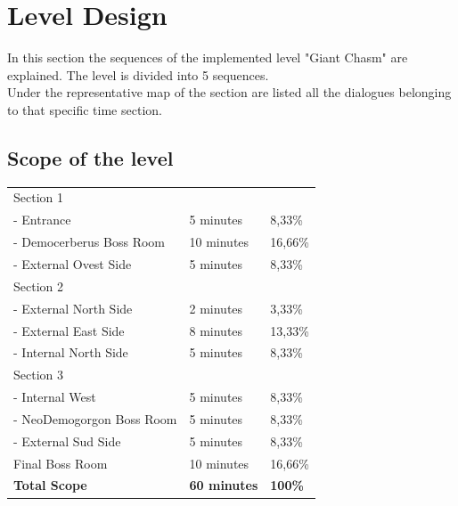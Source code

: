 \section{Level Design}
In this section the sequences of the implemented level "Giant Chasm" are explained. The level is divided into 5 sequences.\\
Under the representative map of the section are listed all the dialogues belonging to that specific time section.

\subsection{Scope of the level}

\vspace*{0.5cm}

\begin{center}
	\begin{tabular}[c]{| p{6cm} | p{4cm} | p{3cm} |}
		\hline
		Section 1 &                & \\
		 - Entrance                   & 5 minutes                  & 8,33\%                 \\
		 - Democerberus Boss Room          & 10 minutes                  & 16,66\%                 \\
		 - External Ovest Side           & 5 minutes			                & 8,33\%	                  \\ \hline
		 Section 2 &                & \\
		 - External North Side                   & 2 minutes                  & 3,33\%                 \\
		 - External East Side          & 8 minutes                  & 13,33\%                 \\
		 - Internal North Side           & 5 minutes		                & 8,33\%                  \\ \hline
		 Section 3 &                & \\
		 - Internal West                   & 5 minutes                  & 8,33\%                 \\
		 - NeoDemogorgon Boss Room          & 5 minutes                  & 8,33\%                 \\
		 - External Sud Side           & 5 minutes			                & 8,33\%	                  \\ \hline
		 Final Boss Room           & 10	minutes		                & 16,66\%	                  \\ \hline
		 \textbf{Total Scope}              & \textbf{60 minutes} & \textbf{100\%}      \\ \hline
	\end{tabular}
\end{center}

